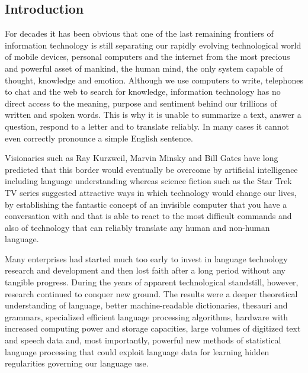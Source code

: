 \documentclass[10pt, plain]{../../metanetpaper}
\begin{document}

\label{sec:pts}

\begin{multicols}{2}
\subsection{Introduction}
\label{sec:pt-introduction}

For decades it has been obvious that one of the last remaining frontiers of information technology is still
separating our rapidly evolving technological world of mobile devices, personal computers and the internet from the most precious and powerful asset of mankind, the human mind, the only system capable of thought, knowledge and emotion. Although we use computers to write, telephones to chat and the web to search for knowledge, information technology has no direct access to the meaning, purpose and sentiment behind our trillions of written and spoken words. This is why it is unable to summarize a text, answer a question, respond to a letter and to translate reliably. In many cases it cannot even correctly pronounce a simple English sentence.

Visionaries such as Ray Kurzweil, Marvin Minsky and Bill Gates have long predicted that this border would eventually be overcome by artificial intelligence including language understanding whereas science fiction such as the Star Trek TV series suggested attractive ways in which technology would change our lives, by establishing the fantastic concept of an invisible computer that you have a conversation with and that is able to react to the most difficult commands and also of technology that can reliably translate any human and non-human language.

Many enterprises had started much too early to invest in language technology research and development and then lost faith after a long period without any tangible progress. During the years of apparent technological standstill, however, research continued to conquer new ground. The results were a deeper theoretical understanding of language, better machine-readable dictionaries, thesauri and grammars, specialized efficient language processing algorithms, hardware with increased computing power and storage capacities, large volumes of digitized text and speech data and, most importantly, powerful new methods of statistical language processing that could exploit language data for learning hidden regularities governing our language use.


\end{multicols}
\end{document}
